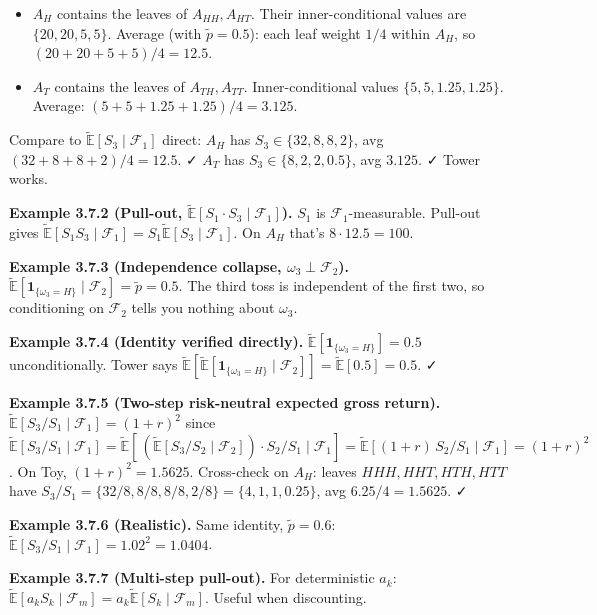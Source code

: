 \documentclass[
  10pt,
  twoside]{book}
\providecommand{\tightlist}{%
  \setlength{\itemsep}{0pt}\setlength{\parskip}{0pt}}
\begin{document}
\begin{itemize}
\tightlist
\item
  \(A_H\) contains the leaves of \(A_{HH}, A_{HT}\). Their
  inner-conditional values are \(\{20,20,5,5\}\). Average (with
  \(\tilde p = 0.5\)): each leaf weight \(1/4\) within \(A_H\), so
  \((20+20+5+5)/4 = 12.5\).
\item
  \(A_T\) contains the leaves of \(A_{TH}, A_{TT}\). Inner-conditional
  values \(\{5,5,1.25,1.25\}\). Average: \((5+5+1.25+1.25)/4 = 3.125\).
\end{itemize}

Compare to \(\tilde{\mathbb E}[S_3 \mid \mathcal F_1]\) direct: \(A_H\)
has \(S_3 \in \{32, 8, 8, 2\}\), avg \((32+8+8+2)/4 = 12.5\). ✓ \(A_T\)
has \(S_3 \in \{8, 2, 2, 0.5\}\), avg \(3.125\). ✓ Tower works.

\textbf{Example 3.7.2 (Pull-out,
\(\tilde{\mathbb E}[S_1 \cdot S_3 \mid \mathcal F_1]\)).} \(S_1\) is
\(\mathcal F_1\)-measurable. Pull-out gives
\(\tilde{\mathbb E}[S_1 S_3 \mid \mathcal F_1] = S_1 \tilde{\mathbb E}[S_3 \mid \mathcal F_1]\).
On \(A_H\) that's \(8 \cdot 12.5 = 100\).

\textbf{Example 3.7.3 (Independence collapse,
\(\omega_3 \perp \mathcal F_2\)).}
\(\tilde{\mathbb E}[\mathbf 1_{\{\omega_3 = H\}} \mid \mathcal F_2] = \tilde p = 0.5\).
The third toss is independent of the first two, so conditioning on
\(\mathcal F_2\) tells you nothing about \(\omega_3\).

\textbf{Example 3.7.4 (Identity verified directly).}
\(\tilde{\mathbb E}[\mathbf 1_{\{\omega_3 = H\}}] = 0.5\)
unconditionally. Tower says
\(\tilde{\mathbb E}[\tilde{\mathbb E}[\mathbf 1_{\{\omega_3=H\}} \mid \mathcal F_2]] = \tilde{\mathbb E}[0.5] = 0.5\).
✓

\textbf{Example 3.7.5 (Two-step risk-neutral expected gross return).}
\(\tilde{\mathbb E}[S_3 / S_1 \mid \mathcal F_1] = (1+r)^2\) since
\(\tilde{\mathbb E}[S_3 / S_1 \mid \mathcal F_1] = \tilde{\mathbb E}[\,(\tilde{\mathbb E}[S_3 / S_2 \mid \mathcal F_2]) \cdot S_2 / S_1 \mid \mathcal F_1] = \tilde{\mathbb E}[(1+r)\,S_2 / S_1 \mid \mathcal F_1] = (1+r)^2\).
On Toy, \((1+r)^2 = 1.5625\). Cross-check on \(A_H\): leaves
\(HHH, HHT, HTH, HTT\) have
\(S_3/S_1 = \{32/8, 8/8, 8/8, 2/8\} = \{4, 1, 1, 0.25\}\), avg
\(6.25/4 = 1.5625\). ✓

\textbf{Example 3.7.6 (Realistic).} Same identity, \(\tilde p = 0.6\):
\(\tilde{\mathbb E}[S_3 / S_1 \mid \mathcal F_1] = 1.02^2 = 1.0404\).

\textbf{Example 3.7.7 (Multi-step pull-out).} For deterministic \(a_k\):
\(\tilde{\mathbb E}[a_k S_k \mid \mathcal F_m] = a_k \tilde{\mathbb E}[S_k \mid \mathcal F_m]\).
Useful when discounting.
\end{document}
